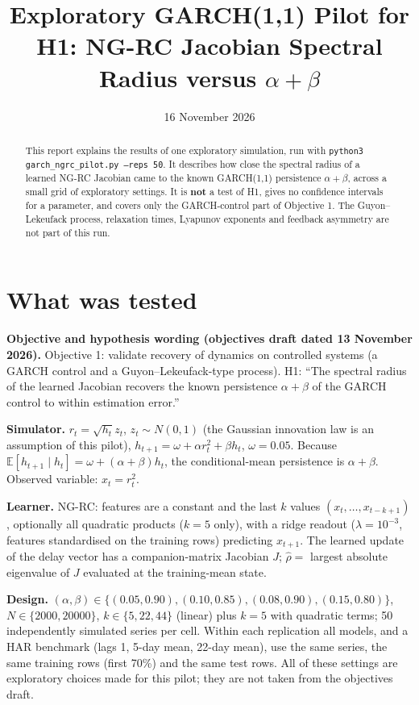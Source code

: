 \documentclass[11pt]{article}
\title{Exploratory GARCH(1,1) Pilot for H1: NG-RC Jacobian Spectral Radius versus $\alpha+\beta$}
\author{}\date{16 November 2026}
\newcommand{\rhohat}{\hat\rho}
\begin{document}
\maketitle
\begin{abstract}\noindent This report explains the results of one exploratory simulation, run with \texttt{python3 garch\_ngrc\_pilot.py --reps 50}. It describes how close the spectral radius of a learned NG-RC Jacobian came to the known GARCH(1,1) persistence $\alpha+\beta$, across a small grid of exploratory settings. It is \textbf{not} a test of H1, gives no confidence intervals for a parameter, and covers only the GARCH-control part of Objective 1. The Guyon--Lekeufack process, relaxation times, Lyapunov exponents and feedback asymmetry are not part of this run.\end{abstract}
\section{What was tested}
\textbf{Objective and hypothesis wording (objectives draft dated 13 November 2026).} Objective 1: validate recovery of dynamics on controlled systems (a GARCH control and a Guyon--Lekeufack-type process). H1: ``The spectral radius of the learned Jacobian recovers the known persistence $\alpha+\beta$ of the GARCH control to within estimation error.''

\textbf{Simulator.} $r_t=\sqrt{h_t}z_t$, $z_t\sim N(0,1)$ (the Gaussian innovation law is an assumption of this pilot), $h_{t+1}=\omega+\alpha r_t^2+\beta h_t$, $\omega=0.05$. Because $\mathbb E[h_{t+1}\mid h_t]=\omega+(\alpha+\beta)h_t$, the conditional-mean persistence is $\alpha+\beta$. Observed variable: $x_t=r_t^2$.

\textbf{Learner.} NG-RC: features are a constant and the last $k$ values $(x_t,\dots,x_{t-k+1})$, optionally all quadratic products ($k=5$ only), with a ridge readout ($\lambda=10^{-3}$, features standardised on the training rows) predicting $x_{t+1}$. The learned update of the delay vector has a companion-matrix Jacobian $J$; $\rhohat=$ largest absolute eigenvalue of $J$ evaluated at the training-mean state.

\textbf{Design.} $(\alpha,\beta)\in\{(0.05,0.90),(0.10,0.85),(0.08,0.90),(0.15,0.80)\}$, $N\in\{2000,20000\}$, $k\in\{5,22,44\}$ (linear) plus $k=5$ with quadratic terms; 50 independently simulated series per cell. Within each replication all models, and a HAR benchmark (lags 1, 5-day mean, 22-day mean), use the same series, the same training rows (first 70\%) and the same test rows. All of these settings are exploratory choices made for this pilot; they are not taken from the objectives draft.
\end{document}
